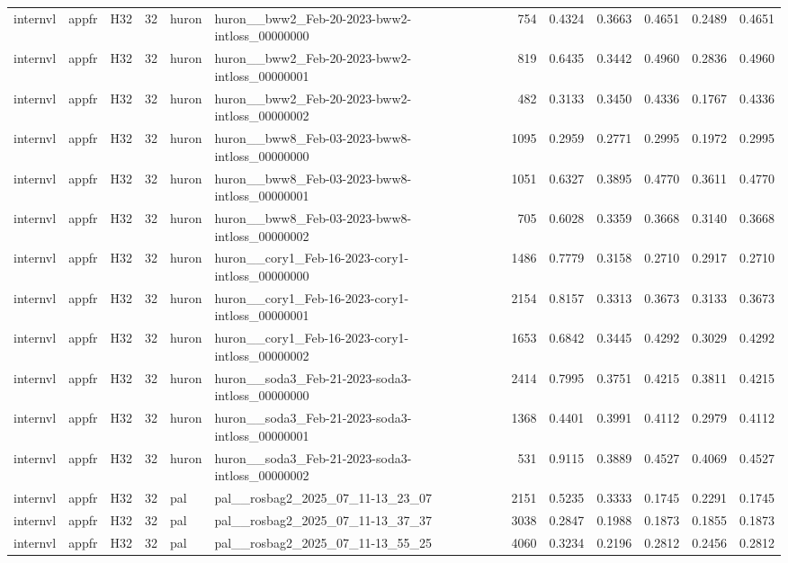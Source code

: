 \begin{table}[tbp]
\begin{tabular}{lllrllrrrrrr}
internvl & appfr & H32 & 32 & huron & huron\_\_bww2\_Feb-20-2023-bww2-intloss\_00000000 & 754 & 0.4324 & 0.3663 & 0.4651 & 0.2489 & 0.4651 \\
internvl & appfr & H32 & 32 & huron & huron\_\_bww2\_Feb-20-2023-bww2-intloss\_00000001 & 819 & 0.6435 & 0.3442 & 0.4960 & 0.2836 & 0.4960 \\
internvl & appfr & H32 & 32 & huron & huron\_\_bww2\_Feb-20-2023-bww2-intloss\_00000002 & 482 & 0.3133 & 0.3450 & 0.4336 & 0.1767 & 0.4336 \\
internvl & appfr & H32 & 32 & huron & huron\_\_bww8\_Feb-03-2023-bww8-intloss\_00000000 & 1095 & 0.2959 & 0.2771 & 0.2995 & 0.1972 & 0.2995 \\
internvl & appfr & H32 & 32 & huron & huron\_\_bww8\_Feb-03-2023-bww8-intloss\_00000001 & 1051 & 0.6327 & 0.3895 & 0.4770 & 0.3611 & 0.4770 \\
internvl & appfr & H32 & 32 & huron & huron\_\_bww8\_Feb-03-2023-bww8-intloss\_00000002 & 705 & 0.6028 & 0.3359 & 0.3668 & 0.3140 & 0.3668 \\
internvl & appfr & H32 & 32 & huron & huron\_\_cory1\_Feb-16-2023-cory1-intloss\_00000000 & 1486 & 0.7779 & 0.3158 & 0.2710 & 0.2917 & 0.2710 \\
internvl & appfr & H32 & 32 & huron & huron\_\_cory1\_Feb-16-2023-cory1-intloss\_00000001 & 2154 & 0.8157 & 0.3313 & 0.3673 & 0.3133 & 0.3673 \\
internvl & appfr & H32 & 32 & huron & huron\_\_cory1\_Feb-16-2023-cory1-intloss\_00000002 & 1653 & 0.6842 & 0.3445 & 0.4292 & 0.3029 & 0.4292 \\
internvl & appfr & H32 & 32 & huron & huron\_\_soda3\_Feb-21-2023-soda3-intloss\_00000000 & 2414 & 0.7995 & 0.3751 & 0.4215 & 0.3811 & 0.4215 \\
internvl & appfr & H32 & 32 & huron & huron\_\_soda3\_Feb-21-2023-soda3-intloss\_00000001 & 1368 & 0.4401 & 0.3991 & 0.4112 & 0.2979 & 0.4112 \\
internvl & appfr & H32 & 32 & huron & huron\_\_soda3\_Feb-21-2023-soda3-intloss\_00000002 & 531 & 0.9115 & 0.3889 & 0.4527 & 0.4069 & 0.4527 \\
internvl & appfr & H32 & 32 & pal & pal\_\_rosbag2\_2025\_07\_11-13\_23\_07 & 2151 & 0.5235 & 0.3333 & 0.1745 & 0.2291 & 0.1745 \\
internvl & appfr & H32 & 32 & pal & pal\_\_rosbag2\_2025\_07\_11-13\_37\_37 & 3038 & 0.2847 & 0.1988 & 0.1873 & 0.1855 & 0.1873 \\
internvl & appfr & H32 & 32 & pal & pal\_\_rosbag2\_2025\_07\_11-13\_55\_25 & 4060 & 0.3234 & 0.2196 & 0.2812 & 0.2456 & 0.2812 \\

\end{tabular}
\end{table}
